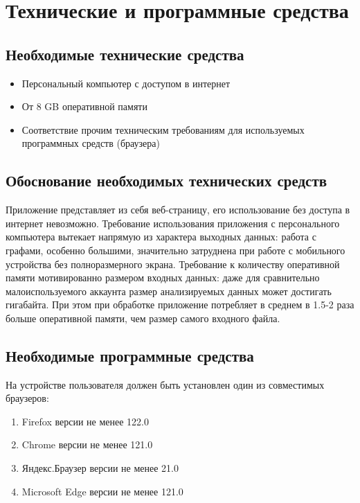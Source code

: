 \section{Технические и программные средства}

\subsection{Необходимые технические средства}

\begin{itemize}
    \item Персональный компьютер с доступом в интернет
    \item От 8 GB оперативной памяти
    \item Соответствие прочим техническим требованиям для используемых программных средств (браузера)
\end{itemize}

\subsection{Обоснование необходимых технических средств}

Приложение представляет из себя веб-страницу, его использование без доступа в интернет невозможно.
Требование использования приложения с персонального компьютера вытекает напрямую из характера выходных данных: работа с графами, особенно большими, значительно затруднена при работе с мобильного устройства без полноразмерного экрана.
Требование к количеству оперативной памяти мотивированно размером входных данных: даже для сравнительно малоиспользуемого аккаунта размер анализируемых данных может достигать гигабайта.
При этом при обработке приложение потребляет в среднем в 1.5-2 раза больше оперативной памяти, чем размер самого входного файла.

\subsection{Необходимые программные средства}

На устройстве пользователя должен быть установлен один из совместимых браузеров:

\begin{enumerate}
    \item Firefox версии не менее 122.0
    \item Chrome версии не менее 121.0
    \item Яндекс.Браузер версии не менее 21.0
    \item Microsoft Edge версии не менее 121.0
\end{enumerate}

